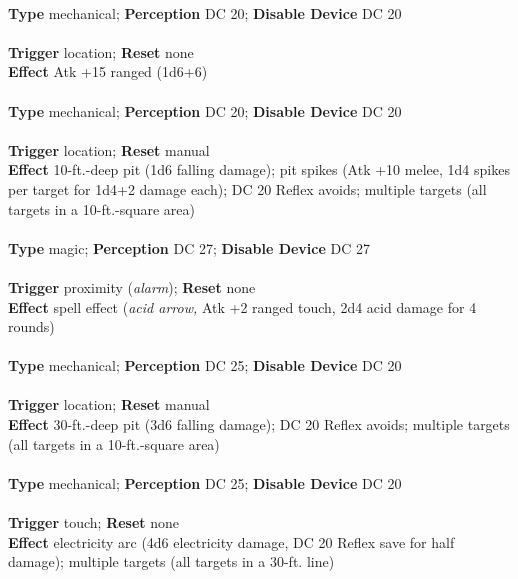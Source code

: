 \\
\textbf{Type }mechanical; \textbf{Perception} DC 20; \textbf{Disable Device} DC 20\\
\\
\textbf{Trigger} location; \textbf{Reset} none\\
\textbf{Effect }Atk +15 ranged (1d6+6)\\

\\
\textbf{Type }mechanical; \textbf{Perception} DC 20; \textbf{Disable Device} DC 20\\
\\
\textbf{Trigger} location; \textbf{Reset} manual\\
\textbf{Effect }10-ft.-deep pit (1d6 falling damage); pit spikes (Atk +10 melee, 1d4 spikes per target for 1d4+2 damage each); DC 20 Reflex avoids; multiple targets (all targets in a 10-ft.-square area)\\

\\
\textbf{Type }magic; \textbf{Perception} DC 27; \textbf{Disable Device} DC 27\\
\\
\textbf{Trigger} proximity (\textit{alarm}); \textbf{Reset} none\\
\textbf{Effect }spell effect (\textit{acid arrow, }Atk +2 ranged touch, 2d4 acid damage for 4 rounds)\\

\\
\textbf{Type }mechanical; \textbf{Perception} DC 25; \textbf{Disable Device} DC 20\\
\\
\textbf{Trigger} location; \textbf{Reset} manual\\
\textbf{Effect }30-ft.-deep pit (3d6 falling damage); DC 20 Reflex avoids; multiple targets (all targets in a 10-ft.-square area)\\

\\
\textbf{Type }mechanical; \textbf{Perception} DC 25; \textbf{Disable Device} DC 20\\
\\
\textbf{Trigger} touch; \textbf{Reset} none\\
\textbf{Effect }electricity arc (4d6 electricity damage, DC 20 Reflex save for half damage); multiple targets (all targets in a 30-ft. line)\\

